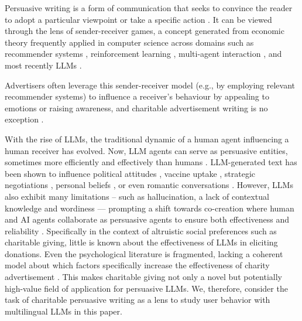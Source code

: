 Persuasive writing is a form of communication that seeks to convince the reader to adopt a particular viewpoint or take a specific action \cite{jonsen2018convincing}. It can be viewed through the lens of sender-receiver games, a concept generated from economic theory frequently applied in computer science across domains such as recommender systems \cite{Apel2020-tt}, reinforcement learning \cite{hiraoka2014reinforcement}, multi-agent interaction \cite{meta2022human}, and most recently LLMs \cite{Shin_Kim_2024}.

Advertisers often leverage this sender-receiver model (e.g., by employing relevant recommender systems) to influence a receiver’s behaviour by appealing to emotions or raising awareness, and charitable advertisement writing is no exception \cite{salvi2024conversational, furumai2024zero,Murphy2001-yn}.

With the rise of LLMs, the traditional dynamic of a human agent influencing a human receiver has evolved. Now, LLM agents can serve as persuasive entities, sometimes more efficiently and effectively than humans \cite{Breum2024-xf, Matz2024-pl, Zeng2024-lp, Xu2023-bs, Goldstein2023-wr,durmus2024measuring}. LLM-generated text has been shown to influence political attitudes \cite{voelkel2023artificial}, vaccine uptake \cite{karinshak2023working}, strategic negotiations \cite{meta2022human}, personal beliefs \cite{salvi2024conversational}, or even romantic conversations \cite{zhou2020design}. However, LLMs also exhibit many limitations -- such as hallucination, a lack of contextual knowledge and wordiness \cite{Myers_2024}--- prompting a shift towards co-creation where human and AI agents collaborate as persuasive agents to ensure both effectiveness and reliability \cite{Dhillon2024-ol, zhang2023human}. Specifically in the context of altruistic social preferences such as charitable giving, little is known about the effectiveness of LLMs in eliciting donations. Even the psychological literature is fragmented, lacking a coherent model about which factors specifically increase the effectiveness of charity advertisement \cite{xu2020relative,saeri2023works,schamp2023effectiveness,fan2020factors}. This makes charitable giving not only a novel but potentially high-value field of application for persuasive LLMs. We, therefore, consider the task of charitable persuasive writing as a lens to study user behavior with multilingual LLMs in this paper.




